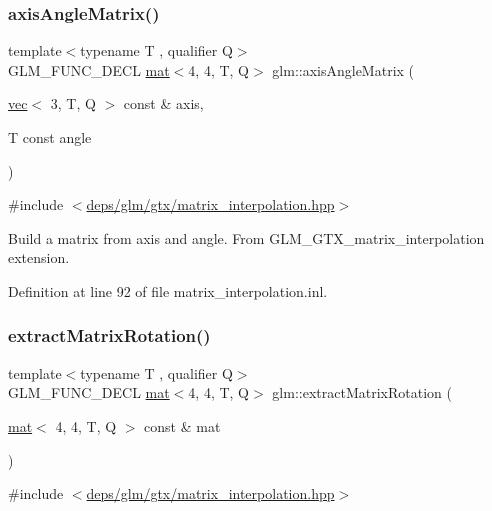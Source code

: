 \subsubsection{\texorpdfstring{axis\+Angle\+Matrix()}{axisAngleMatrix()}}
{\footnotesize\ttfamily template$<$typename T , qualifier Q$>$ \\
G\+L\+M\+\_\+\+F\+U\+N\+C\+\_\+\+D\+E\+CL \hyperlink{structglm_1_1mat}{mat}$<$4, 4, T, Q$>$ glm\+::axis\+Angle\+Matrix (\begin{DoxyParamCaption}\item[{\hyperlink{structglm_1_1vec}{vec}$<$ 3, T, Q $>$ const \&}]{axis,  }\item[{T const}]{angle }\end{DoxyParamCaption})}



{\ttfamily \#include $<$\hyperlink{matrix__interpolation_8hpp}{deps/glm/gtx/matrix\+\_\+interpolation.\+hpp}$>$}

Build a matrix from axis and angle. From G\+L\+M\+\_\+\+G\+T\+X\+\_\+matrix\+\_\+interpolation extension. 

Definition at line 92 of file matrix\+\_\+interpolation.\+inl.

\mbox{\label{group__gtx__matrix__interpolation_ga8834d4499a1a52fcf531b4506f0b5f67}} 
\subsubsection{\texorpdfstring{extract\+Matrix\+Rotation()}{extractMatrixRotation()}}
{\footnotesize\ttfamily template$<$typename T , qualifier Q$>$ \\
G\+L\+M\+\_\+\+F\+U\+N\+C\+\_\+\+D\+E\+CL \hyperlink{structglm_1_1mat}{mat}$<$4, 4, T, Q$>$ glm\+::extract\+Matrix\+Rotation (\begin{DoxyParamCaption}\item[{\hyperlink{structglm_1_1mat}{mat}$<$ 4, 4, T, Q $>$ const \&}]{mat }\end{DoxyParamCaption})}



{\ttfamily \#include $<$\hyperlink{matrix__interpolation_8hpp}{deps/glm/gtx/matrix\+\_\+interpolation.\+hpp}$>$}

